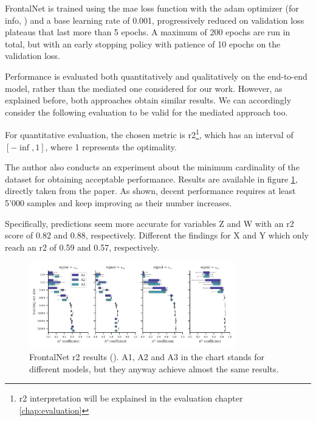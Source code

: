 FrontalNet is trained using the \gls{mae} loss function with the \gls{adam} optimizer (for info, \cite{kingma2014adam}) and a base learning rate of 0.001, progressively reduced on validation loss plateaus that last more than 5 epochs. A maximum of 200 epochs are run in total, but with an early stopping policy with patience of 10 epochs on the validation loss. 

Performance is evaluated both quantitatively and qualitatively on the end-to-end model, rather than the mediated one considered for our work. However, as explained before, both approaches obtain similar results. We can accordingly consider the following evaluation to be valid for the mediated approach too.

\medskip 

For quantitative evaluation, the chosen metric is \gls{r2}\footnote{\gls{r2} interpretation will be explained in the evaluation chapter \ref{chap:evaluation}}, which has an interval of $[-\inf, 1]$, where 1 represents the optimality. 

The author also conducts an experiment about the minimum cardinality of the dataset for obtaining acceptable performance. Results are available in figure \ref{fig:frontalnet-r2}, directly taken from the paper. As shown, decent performance requires at least 5'000 samples and keep improving as their number increases.

Specifically, predictions seem more accurate for variables Z and W with an \gls{r2} score of 0.82 and 0.88, respectively. Different the findings for X and Y which only reach an \gls{r2} of 0.59 and 0.57, respectively.

\begin{figure}[!htb]
	\centering
	\includegraphics[width=0.8\textwidth]{"contents/images/03-frontalnet-r2"}
	\caption[FrontalNet \gls{r2} results (\cite{mantegazza2019visionbased})]{FrontalNet \gls{r2} results (\cite{mantegazza2019visionbased}). A1, A2 and A3 in the chart stands for different models, but they anyway achieve almost the same results.}
	\label{fig:frontalnet-r2}
\end{figure}


